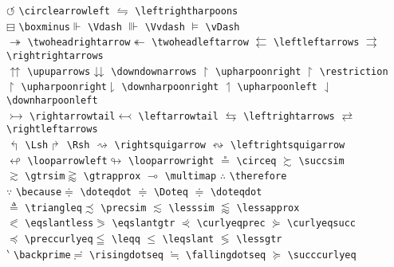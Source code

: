 \documentclass{asl}
\begin{document}
\begin{tabbing}
$\circlearrowleft$ \>\verb+\circlearrowleft+\>
$\leftrightharpoons$ \>\verb+\leftrightharpoons+\\
$\boxminus$ \>\verb+\boxminus+\>$\Vdash$ \>\verb+\Vdash+\>
$\Vvdash$ \>\verb+\Vvdash+\>
$\vDash$ \>\verb+\vDash+\\
$\twoheadrightarrow$ \>\verb+\twoheadrightarrow+\>$\twoheadleftarrow$ \>\verb+\twoheadleftarrow+\>
$\leftleftarrows$ \>\verb+\leftleftarrows+\>
$\rightrightarrows$ \>\verb+\rightrightarrows+\\
$\upuparrows$ \>\verb+\upuparrows+\>$\downdownarrows$ \>\verb+\downdownarrows+\>
$\upharpoonright$ \>\verb+\upharpoonright+\>
$\restriction$ \>\verb+\restriction+\\
$\upharpoonright$ \>\verb+\upharpoonright+\>$\downharpoonright$ \>\verb+\downharpoonright+\>
$\upharpoonleft$ \>\verb+\upharpoonleft+\>
$\downharpoonleft$ \>\verb+\downharpoonleft+\\
$\rightarrowtail$ \>\verb+\rightarrowtail+\>$\leftarrowtail$ \>\verb+\leftarrowtail+\>
$\leftrightarrows$ \>\verb+\leftrightarrows+\>
$\rightleftarrows$ \>\verb+\rightleftarrows+\\
$\Lsh$ \>\verb+\Lsh+\>$\Rsh$ \>\verb+\Rsh+\>
$\rightsquigarrow$ \>\verb+\rightsquigarrow+\>
$\leftrightsquigarrow$ \>\verb+\leftrightsquigarrow+\\
$\looparrowleft$ \>\verb+\looparrowleft+\>$\looparrowright$ \>\verb+\looparrowright+\>
$\circeq$ \>\verb+\circeq+\>
$\succsim$ \>\verb+\succsim+\\
$\gtrsim$ \>\verb+\gtrsim+\>$\gtrapprox$ \>\verb+\gtrapprox+\>
$\multimap$ \>\verb+\multimap+\>
$\therefore$ \>\verb+\therefore+\\
$\because$ \>\verb+\because+\>$\doteqdot$ \>\verb+\doteqdot+\>
$\Doteq$ \>\verb+\Doteq+\>
$\doteqdot$ \>\verb+\doteqdot+\\
$\triangleq$ \>\verb+\triangleq+\>$\precsim$ \>\verb+\precsim+\>
$\lesssim$ \>\verb+\lesssim+\>
$\lessapprox$ \>\verb+\lessapprox+\\
$\eqslantless$ \>\verb+\eqslantless+\>$\eqslantgtr$ \>\verb+\eqslantgtr+\>
$\curlyeqprec$ \>\verb+\curlyeqprec+\>
$\curlyeqsucc$ \>\verb+\curlyeqsucc+\\
$\preccurlyeq$ \>\verb+\preccurlyeq+\>$\leqq$ \>\verb+\leqq+\>
$\leqslant$ \>\verb+\leqslant+\>
$\lessgtr$ \>\verb+\lessgtr+\\
$\backprime$ \>\verb+\backprime+\>$\risingdotseq$ \>\verb+\risingdotseq+\>
$\fallingdotseq$ \>\verb+\fallingdotseq+\>
$\succcurlyeq$ \>\verb+\succcurlyeq+\\

\end{tabbing}
\end{document}
